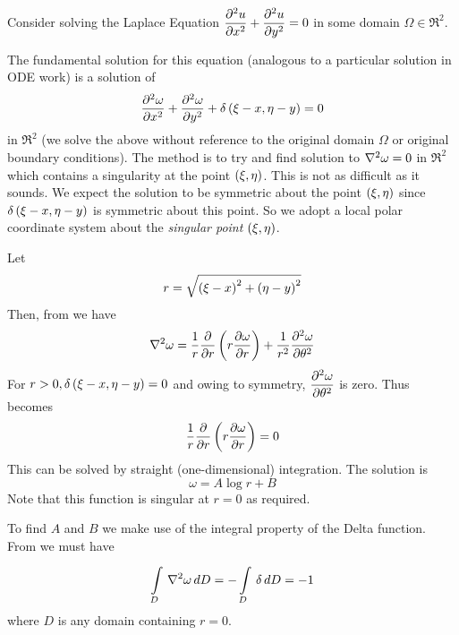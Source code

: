 Consider solving the Laplace Equation $ \dfrac{\partial^{2} u}{\partial {x}^{2}}  +  \dfrac{\partial^{2} u}{\partial {y}^{2}}  
= 0$ in some domain $\Omega \in \Re^{2}$. %

The fundamental solution for this equation (analogous to a particular solution
in ODE work) is a solution of
\begin{equation}
   \dfrac{\partial^{2} \omega}{\partial {x}^{2}}  +  \dfrac{\partial^{2} \omega}{\partial {y}^{2}}  +  \delta\left( \xi - x,\eta - y \right)  = 0
  \label{eqn:Fsoln}
\end{equation}
in $\Re^{2}$ (\ie we solve the above without reference to the original domain
$\Omega$ or original boundary conditions). The method is to try and find
solution to $\nabla^{2} {\omega}=0$ in $\Re^{2}$ which contains a singularity at the
point $\left( \xi,\eta \right)$. This is not as difficult as it sounds.  We expect
the solution to be symmetric about the point $\left( \xi,\eta \right)$ since
$ \delta\left( \xi - x,\eta - y \right) $ is symmetric about this point.  So we adopt a
local polar coordinate system about the \emph{singular point} $\left( \xi,\eta \right)$.

Let  
\begin{equation*}
  r = \sqrt{\left( \xi - x \right)^{2} + \left( \eta - y \right)^{2}}
\end{equation*}      
Then, from  we have
\begin{equation}
  \nabla^{2} {\omega} = \dfrac{1}{r} \dfrac{\partial  }{\partial r}  \left( r \dfrac{\partial \omega}{\partial r}  \right)
  + \dfrac{1}{r^{2}}  \dfrac{\partial^{2} \omega}{\partial {\theta}^{2}}     
  \label{eqn:Fsoln2}
\end{equation}
For $r > 0,  \delta\left( \xi - x,\eta - y \right)  = 0$ and owing to symmetry,
$ \dfrac{\partial^{2} \omega}{\partial {\theta}^{2}} $ is zero.  Thus  becomes
\begin{equation*}
  \dfrac{1}{r} \dfrac{\partial  }{\partial r} \left( r \dfrac{\partial \omega}{\partial r}  \right) = 0 
\end{equation*}
This can be solved by straight (one-dimensional) integration.  The solution is 
\begin{equation}
  \omega = A \log r + B
  \label{eqn:Fsoln3}
\end{equation}
Note that this function is singular at $r = 0$ as required.

To find $A$ and $B$ we make use of the integral property of the Delta
function. From  we must have
\begin{equation}
     \displaystyle\int\limits_{D}^{} \,\nabla^{2} {\omega}\,dD   = -    \displaystyle\int\limits_{D}^{} \,\delta\,dD   = -1
  \label{eqn:Fsoln4}
\end{equation}
where $D$ is any domain containing $r = 0$.

